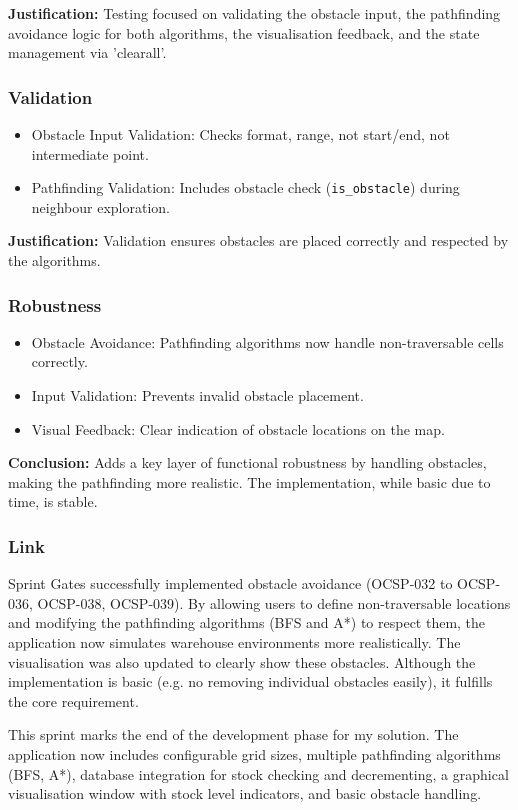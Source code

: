\textbf{Justification:} Testing focused on validating the obstacle input, the pathfinding avoidance logic for both algorithms, the visualisation feedback, and the state management via 'clearall'.

\subsubsection{Validation}
\begin{itemize}
	\item Obstacle Input Validation: Checks format, range, not start/end, not intermediate point.
	\item Pathfinding Validation: Includes obstacle check (\verb|is_obstacle|) during neighbour exploration.
\end{itemize}
\textbf{Justification:} Validation ensures obstacles are placed correctly and respected by the algorithms.

\subsubsection{Robustness}
\begin{itemize}
	\item Obstacle Avoidance: Pathfinding algorithms now handle non-traversable cells correctly.
	\item Input Validation: Prevents invalid obstacle placement.
	\item Visual Feedback: Clear indication of obstacle locations on the map.
\end{itemize}
\textbf{Conclusion:} Adds a key layer of functional robustness by handling obstacles, making the pathfinding more realistic. The implementation, while basic due to time, is stable.


\subsubsection{Link}
Sprint Gates successfully implemented obstacle avoidance (OCSP-032 to OCSP-036, OCSP-038, OCSP-039). By allowing users to define non-traversable locations and modifying the pathfinding algorithms (BFS and A*) to respect them, the application now simulates warehouse environments more realistically. The visualisation was also updated to clearly show these obstacles. Although the implementation is basic (e.g. no removing individual obstacles easily), it fulfills the core requirement.

This sprint marks the end of the development phase for my solution. The application now includes configurable grid sizes, multiple pathfinding algorithms (BFS, A*), database integration for stock checking and decrementing, a graphical visualisation window with stock level indicators, and basic obstacle handling.


